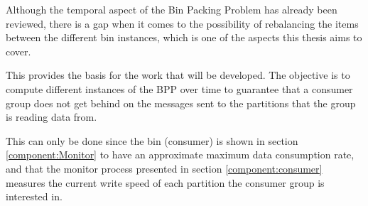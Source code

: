 Although the temporal aspect of the Bin Packing Problem has already been
reviewed, there is a gap when it comes to the possibility of rebalancing the
items between the different bin instances, which is one of the aspects this
thesis aims to cover. 

This provides the basis for the work that will be developed. The objective is to
compute different instances of the BPP over time to guarantee that a consumer
group does not get behind on the messages sent to the partitions that the group
is reading data from. 

This can only be done since the bin (consumer) is shown in section
\ref{component:Monitor} to have an approximate maximum data consumption rate,
and that the monitor process presented in section \ref{component:consumer}
measures the current write speed of each partition the consumer group is
interested in.




